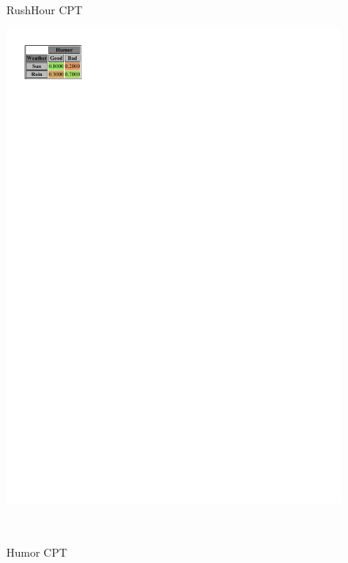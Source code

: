 \documentclass[a4paper,12pt]{article} %
\begin{document}
\begin{figure}[H]
\begin{center}
\begin{minipage}[c]{.3\textwidth}
		\caption*{RushHour CPT}
		\label{fig:rushhour}
	\end{minipage}

	\begin{minipage}[c]{.28\textwidth}
		\centering
		\includegraphics[width=.9\linewidth]{../code/humor.pdf}	
		\caption*{Humor CPT}
		\label{fig:humor}
	\end{minipage}
	~
	\begin{minipage}[c]{.31\textwidth}
		\centering

\end{minipage}
\end{center}
\end{figure}
\end{document}
